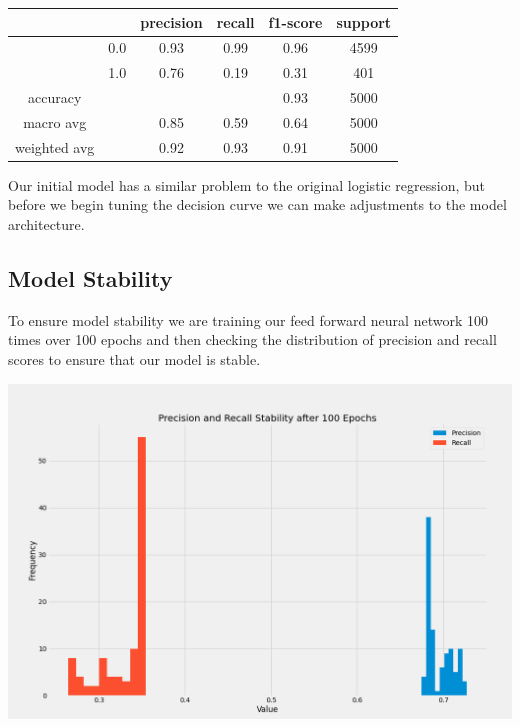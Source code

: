 \documentclass[12pt]{article}
\begin{document}
	\begin{tabular}{c|c|c|c|c|c}
	\hline
	& 		& 	precision &  recall  & f1-score   & support \\ \hline
	
	&  0.0	&		0.93 &     0.99   &  0.96   &  4599 \\ \hline
	&  1.0  &		0.76 &     0.19   &  0.31   &   401 \\ \hline
	
	accuracy    & & & &                       		  0.93   &   5000 \\ \hline
	macro avg   & &   			0.85   &   0.59  &    0.64   &   5000  \\ \hline
	weighted avg  & &   		0.92   &   0.93  &    0.91   &   5000 \\ \hline
	\end{tabular}
	
	Our initial model has a similar problem to the original logistic regression, but before we begin tuning the decision curve we can make adjustments to the model architecture. 
	
	
	\subsection{Model Stability}
	
	To ensure model stability we are training our feed forward neural network 100 times over 100 epochs and then checking the distribution of precision and recall scores to ensure that our model is stable. 
	
	\begin{center}
		\includegraphics[scale=0.4]{../notebooks/StableNetwork.png}
	\end{center}
	
\end{document}

